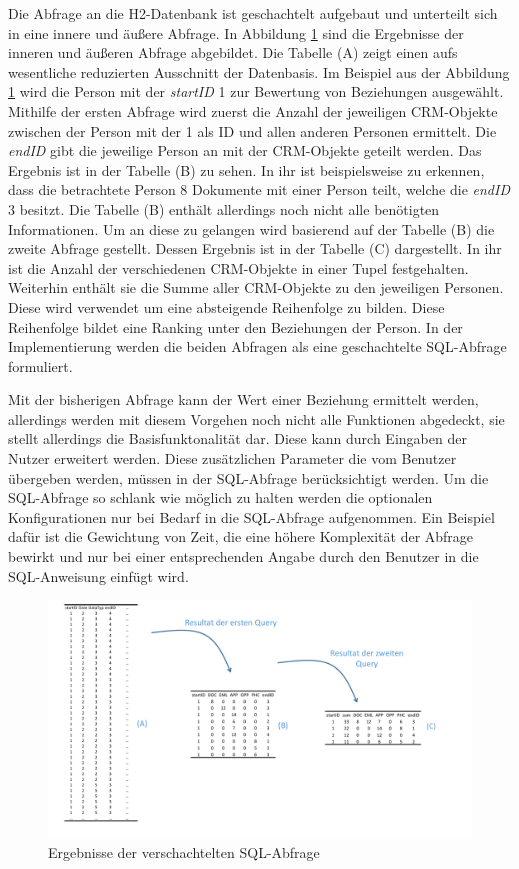 Die Abfrage an die H2-Datenbank ist geschachtelt aufgebaut und unterteilt sich in eine innere und äußere Abfrage. In Abbildung \ref{umsetzung_sql} sind die Ergebnisse der inneren und äußeren Abfrage abgebildet. Die Tabelle (A) zeigt einen aufs wesentliche reduzierten Ausschnitt der Datenbasis. Im Beispiel aus der Abbildung \ref{umsetzung_sql} wird die Person mit der \textit{startID} 1 zur Bewertung von Beziehungen ausgewählt. Mithilfe der ersten Abfrage wird zuerst die Anzahl der jeweiligen CRM-Objekte zwischen der Person mit der 1 als ID und allen anderen Personen ermittelt. Die \textit{endID} gibt die jeweilige Person an mit der CRM-Objekte geteilt werden. Das Ergebnis ist in der Tabelle (B) zu sehen. In ihr ist beispielsweise zu erkennen, dass die betrachtete Person 8 Dokumente mit einer Person teilt, welche die \textit{endID} 3 besitzt. Die Tabelle (B) enthält allerdings noch nicht alle benötigten Informationen. Um an diese zu gelangen wird basierend auf der Tabelle (B) die zweite Abfrage gestellt. Dessen Ergebnis ist in der Tabelle (C) dargestellt. In ihr ist die Anzahl der verschiedenen CRM-Objekte in einer Tupel festgehalten. Weiterhin enthält sie die Summe aller CRM-Objekte zu den jeweiligen Personen. Diese wird verwendet um eine absteigende Reihenfolge zu bilden. Diese Reihenfolge bildet eine Ranking unter den Beziehungen der Person. In der Implementierung werden die beiden Abfragen als eine geschachtelte SQL-Abfrage formuliert.

Mit der bisherigen Abfrage kann der Wert einer Beziehung ermittelt werden, allerdings werden mit diesem Vorgehen noch nicht alle Funktionen abgedeckt, sie stellt allerdings die Basisfunktonalität dar. Diese kann durch Eingaben der Nutzer erweitert werden. Diese zusätzlichen Parameter die vom Benutzer übergeben werden, müssen in der SQL-Abfrage berücksichtigt werden. Um die SQL-Abfrage so schlank wie möglich zu halten werden die optionalen Konfigurationen nur bei Bedarf in die SQL-Abfrage aufgenommen. Ein Beispiel dafür ist die Gewichtung von Zeit, die eine höhere Komplexität der Abfrage bewirkt und nur bei einer entsprechenden Angabe durch den Benutzer in die SQL-Anweisung einfügt wird.

\begin{figure}[htbp]
\centering
  \includegraphics[width=1.0\textwidth]{pics/sql_abfrage.pdf}
\caption{Ergebnisse der verschachtelten SQL-Abfrage}
\label{umsetzung_sql}
\end{figure}

